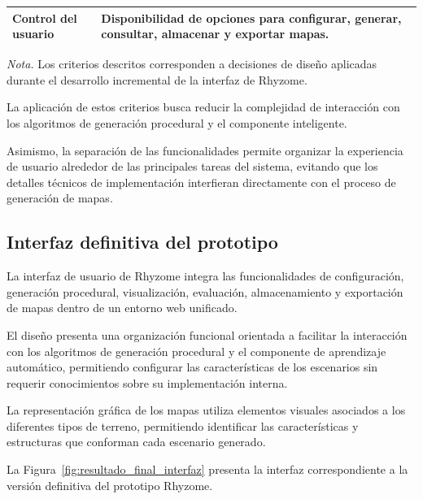 \begin{table}[htbp]
\begin{tabularx}{\textwidth}{
			|>{\raggedright\arraybackslash}p{3.5cm}|
			>{\raggedright\arraybackslash}X|
		}
		\hline
		
		\textbf{Control del usuario} &
		Disponibilidad de opciones para configurar, generar, consultar, almacenar y exportar mapas. \\
		
		\hline
		
	\end{tabularx}
	
	\par\smallskip
	\raggedright
	
	\textit{Nota.} Los criterios descritos corresponden a decisiones de diseño aplicadas durante el desarrollo incremental de la interfaz de Rhyzome.
	
\end{table}

\FloatBarrier

La aplicación de estos criterios busca reducir la complejidad de interacción con los algoritmos de generación procedural y el componente inteligente.

Asimismo, la separación de las funcionalidades permite organizar la experiencia de usuario alrededor de las principales tareas del sistema, evitando que los detalles técnicos de implementación interfieran directamente con el proceso de generación de mapas.

\subsection{Interfaz definitiva del prototipo}
\label{subsec:resultados_diseno_interfaz}

La interfaz de usuario de Rhyzome integra las funcionalidades de configuración, generación procedural, visualización, evaluación, almacenamiento y exportación de mapas dentro de un entorno web unificado.

El diseño presenta una organización funcional orientada a facilitar la interacción con los algoritmos de generación
procedural y el componente de aprendizaje automático, permitiendo configurar las características de los escenarios
sin requerir conocimientos sobre su implementación interna.

La representación gráfica de los mapas utiliza elementos visuales asociados a los diferentes tipos de terreno, permitiendo identificar las características y estructuras que conforman cada escenario generado.

La Figura~\ref{fig:resultado_final_interfaz} presenta la interfaz correspondiente a la versión definitiva del prototipo Rhyzome.

